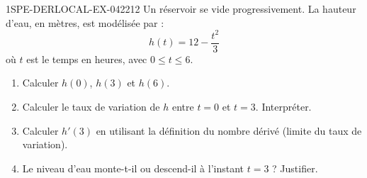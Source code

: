 \begin{exercice}{1SPE-DERLOCAL-EX-042}{2}{12}
Un réservoir se vide progressivement. La hauteur d'eau, en mètres, est modélisée par :
\[
h(t) = 12 - \frac{t^2}{3}
\]
où $t$ est le temps en heures, avec $0 \leqslant t \leqslant 6$.
\begin{enumerate}
\item Calculer $h(0)$, $h(3)$ et $h(6)$.
\item Calculer le taux de variation de $h$ entre $t = 0$ et $t = 3$. Interpréter.
\item Calculer $h'(3)$ en utilisant la définition du nombre dérivé (limite du taux de variation).
\item Le niveau d'eau monte-t-il ou descend-il à l'instant $t = 3$ ? Justifier.
\end{enumerate}
\end{exercice}
